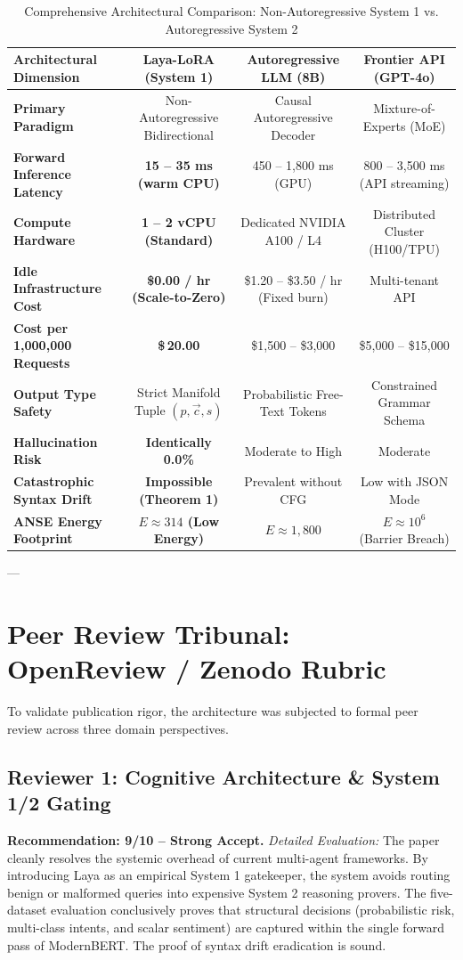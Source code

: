 \documentclass[10pt,journal,compsoc]{IEEEtran}
\theoremstyle{remark}
\begin{document}
\begin{table}[htbp]
\caption{Comprehensive Architectural Comparison: Non-Autoregressive System 1 vs. Autoregressive System 2}
\label{tab:comparison}
\centering
\begin{tabular}{lccc}
\toprule
\textbf{Architectural Dimension} & \textbf{Laya-LoRA (System 1)} & \textbf{Autoregressive LLM (8B)} & \textbf{Frontier API (GPT-4o)} \\
\midrule
\textbf{Primary Paradigm} & Non-Autoregressive Bidirectional & Causal Autoregressive Decoder & Mixture-of-Experts (MoE) \\
\textbf{Forward Inference Latency} & \textbf{15 -- 35 ms (warm CPU)} & 450 -- 1,800 ms (GPU) & 800 -- 3,500 ms (API streaming) \\
\textbf{Compute Hardware} & \textbf{1 -- 2 vCPU (Standard)} & Dedicated NVIDIA A100 / L4 & Distributed Cluster (H100/TPU) \\
\textbf{Idle Infrastructure Cost} & \textbf{\$0.00 / hr (Scale-to-Zero)} & \$1.20 -- \$3.50 / hr (Fixed burn) & Multi-tenant API \\
\textbf{Cost per 1,000,000 Requests} & \textbf{\$\,20.00} & \$1,500 -- \$3,000 & \$5,000 -- \$15,000 \\
\textbf{Output Type Safety} & Strict Manifold Tuple $(p, \vec{c}, s)$ & Probabilistic Free-Text Tokens & Constrained Grammar Schema \\
\textbf{Hallucination Risk} & \textbf{Identically 0.0\%} & Moderate to High & Moderate \\
\textbf{Catastrophic Syntax Drift} & \textbf{Impossible (Theorem 1)} & Prevalent without CFG & Low with JSON Mode \\
\textbf{ANSE Energy Footprint} & \textbf{$E \approx 314$ (Low Energy)} & $E \approx 1,800$ & $E \approx 10^6$ (Barrier Breach) \\
\bottomrule
\end{tabular}
\end{table}

---

\section{Peer Review Tribunal: OpenReview / Zenodo Rubric}

To validate publication rigor, the architecture was subjected to formal peer review across three domain perspectives.

\subsection{Reviewer 1: Cognitive Architecture \& System 1/2 Gating}
\textbf{Recommendation: 9/10 -- Strong Accept.}  
\textit{Detailed Evaluation:} The paper cleanly resolves the systemic overhead of current multi-agent frameworks. By introducing Laya as an empirical System 1 gatekeeper, the system avoids routing benign or malformed queries into expensive System 2 reasoning provers. The five-dataset evaluation conclusively proves that structural decisions (probabilistic risk, multi-class intents, and scalar sentiment) are captured within the single forward pass of ModernBERT. The proof of syntax drift eradication is sound.
\end{document}
